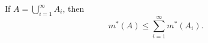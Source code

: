\begin{theorem}[Theorem 3.2]
If $A = \bigcup_{i=1}^{\infty} A_i$, then
$$
m^*(A) \leq \sum_{i=1}^{\infty} m^*(A_i).
$$
\end{theorem}

